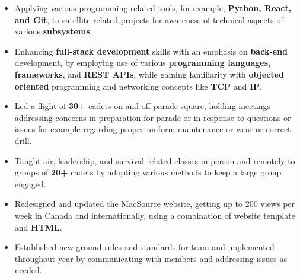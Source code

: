 \documentclass[10pt,a4paper,normalphoto]{altacv}
\begin{document}
\begin{paracol}{2}
\begin{itemize}
\item Applying various programming-related tools, for example, \textbf{Python, React, and Git}, to satellite-related projects for awareness of technical aspects of various \textbf{subsystems}.
\item Enhancing \textbf{full-stack development} skills with an emphasis on \textbf{back-end} development, by employing use of various \textbf{programming languages, frameworks}, and \textbf{REST APIs}, while gaining familiarity with \textbf{objected
oriented} programming and networking concepts like \textbf{TCP} and \textbf{IP}.
\end{itemize}



\begin{itemize}
\item Led a flight of \textbf{30+} cadets on and off parade square, holding meetings addressing concerns in preparation for parade or in response to questions or issues for example regarding proper uniform maintenance or wear or correct drill.
\item Taught air, leadership, and survival-related classes in-person and remotely to groups of \textbf{20+} cadets by adopting various methods to keep a large group engaged.
\end{itemize}
\divider
{}
\begin{itemize}
\item Redesigned and updated the MacSource website, getting up to 200 views per week in Canada and
internationally, using a combination of website template and \textbf{HTML}.
\item Established new ground rules and standards for team and implemented throughout year by
communicating with members and addressing issues as needed.
\end{itemize}



\newpage

\switchcolumn




\end{paracol}
\end{document}
